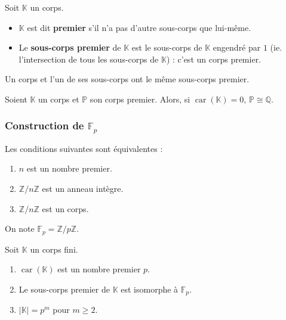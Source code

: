   \begin{definition}
    Soit $\mathbb{K}$ un corps.
    \begin{itemize}
      \item $\mathbb{K}$ est dit \textbf{premier} s'il n'a pas d'autre sous-corps que lui-même.
      \item Le \textbf{sous-corps premier} de $\mathbb{K}$ est le sous-corps de $\mathbb{K}$ engendré par $1$ (ie. l'intersection de tous les sous-corps de $\mathbb{K}$) : c'est un corps premier.
    \end{itemize}
  \end{definition}

  \begin{remark}
    Un corps et l'un de ses sous-corps ont le même sous-corps premier.
  \end{remark}

  \begin{proposition}
    Soient $\mathbb{K}$ un corps et $\mathbb{P}$ son corps premier. Alors, si $\operatorname{car}(\mathbb{K}) = 0$, $\mathbb{P} \cong \mathbb{Q}$.
  \end{proposition}

  \subsubsection{Construction de \texorpdfstring{$\mathbb{F}_p$}{Fp}}


  \begin{proposition}
    Les conditions suivantes sont équivalentes :
    \begin{enumerate}[label={\bfseries(\roman*)}]
      \item $n$ est un nombre premier.
      \item $\mathbb{Z}/n\mathbb{Z}$ est un anneau intègre.
      \item $\mathbb{Z}/n\mathbb{Z}$ est un corps.
    \end{enumerate}
  \end{proposition}

  \begin{notation}
    On note $\mathbb{F}_p = \mathbb{Z}/p\mathbb{Z}$.
  \end{notation}


  \begin{proposition}
    Soit $\mathbb{K}$ un corps fini.
    \begin{enumerate}[label={\bfseries(\roman*)}]
      \item $\operatorname{car}(\mathbb{K})$ est un nombre premier $p$.
      \item Le sous-corps premier de $\mathbb{K}$ est isomorphe à $\mathbb{F}_p$.
      \item $\vert \mathbb{K} \vert = p^m$ pour $m \geq 2$.
    \end{enumerate}
  \end{proposition}

